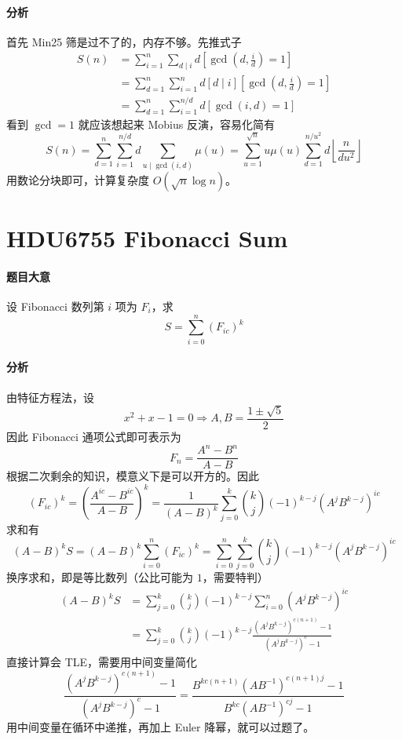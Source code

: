 \paragraph{分析}

首先 Min25 筛是过不了的，内存不够。先推式子
\[ \begin{aligned}
S (n) &= \sum_{i = 1}^n \sum_{d \mid i} d \left[ \gcd \left( d, \frac{i}{d} \right) = 1 \right] \\
&= \sum_{d = 1}^n \sum_{i = 1}^n d [d \mid i] \left[\gcd \left( d, \frac{i}{d} \right) = 1 \right] \\
&= \sum_{d = 1}^n \sum_{i = 1}^{n / d} d [\gcd (i, d) = 1]
\end{aligned} \]
看到 $\gcd = 1$ 就应该想起来 Mobius 反演，容易化简有
\[ S (n) = \sum_{d = 1}^n \sum_{i = 1}^{n / d} d \sum_{u \mid \gcd (i, d)} \mu(u) = \sum_{u = 1}^{\sqrt{n}} u \mu (u) \sum_{d = 1}^{n / u^2} d \left\lfloor \frac{n}{d u^2} \right\rfloor \]
用数论分块即可，计算复杂度 $O ( \sqrt{n} \log n )$。

\section{HDU6755 Fibonacci Sum}

\paragraph{题目大意}

设 Fibonacci 数列第 $i$ 项为 $F_i$，求
\[ S = \sum_{i = 0}^n (F_{i c})^k \]
\paragraph{分析}

由特征方程法，设
\[ x^2 + x - 1 = 0 \Longrightarrow A, B = \frac{1 \pm \sqrt{5}}{2} \]
因此 Fibonacci 通项公式即可表示为
\[ F_n = \frac{A^n - B^n}{A - B} \]
根据二次剩余的知识，模意义下是可以开方的。因此
\[ (F_{i c})^k = \left( \frac{A^{i c} - B^{i c}}{A - B} \right)^k
= \frac{1}{(A - B)^k} \sum_{j = 0}^k \binom{k}{j} (- 1)^{k - j} (A^j B^{k - j})^{i c} \]
求和有
\[ (A - B)^k S = (A - B)^k \sum_{i = 0}^n (F_{i c})^k = \sum_{i = 0}^n \sum_{j
= 0}^k \binom{k}{j} (- 1)^{k - j} (A^j B^{k - j})^{i c} \]
换序求和，即是等比数列（公比可能为 $1$，需要特判）
\[ \begin{aligned}
(A-B)^{k}S
& =\sum_{j=0}^{k}\binom{k}{j}(-1)^{k-j}\sum_{i=0}^{n}(A^{j}B^{k-j})^{ic}\\
& =\sum_{j=0}^{k}\binom{k}{j}(-1)^{k-j}{\frac{(A^{j}B^{k-j})^{c(n+1)}-1}{(A^{j}B^{k-j})^{c}-1}}
\end{aligned} \]
直接计算会 TLE，需要用中间变量简化
\[ \frac{(A^j B^{k - j})^{c (n + 1)} - 1}{(A^j B^{k - j})^c - 1} = \frac{B^{k c (n + 1)} {(A B^{- 1})^{c (n + 1) j}}  - 1}{B^{k c} (A B^{- 1})^{c j} - 1} \]
用中间变量在循环中递推，再加上 Euler 降幂，就可以过题了。

